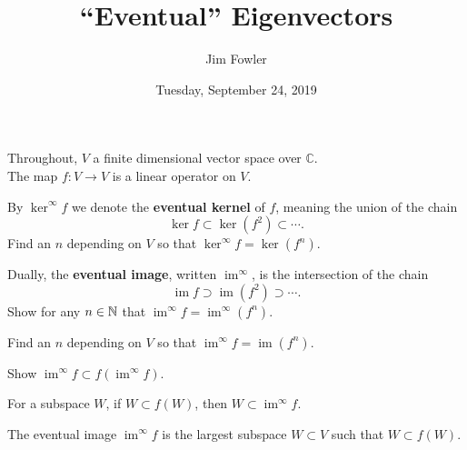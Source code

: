 \documentclass{homework}
\author{Jim Fowler}
\title{``Eventual'' Eigenvectors}
\date{Tuesday, September 24, 2019}
\newcommand{\C}{\mathbb{C}}
\DeclareMathOperator{\image}{im}
\begin{document}
\maketitle

Throughout, $V$ a finite dimensional vector space over $\C$. \\[1ex]
The map $f : V \to V$ is a linear operator on $V$.


\begin{problem}
  By $\ker^\infty f$ we denote the \textbf{eventual kernel} of $f$, meaning the union of the chain
  \[
    \ker f \subset \ker (f^2) \subset \cdots.
  \]
  Find an $n$ depending on $V$ so that $\ker^\infty f = \ker (f^n)$.
\end{problem}

\vfill

\begin{problem}
  Dually, the \textbf{eventual image}, written $\image^\infty$, is the intersection of the chain
  \[
    \image f \supset \image (f^2) \supset \cdots.
  \]
  Show for any $n \in \mathbb{N}$ that $\image^\infty f = \image^\infty (f^n)$.
\end{problem}

\vfill

\begin{problem}
  Find an $n$ depending on $V$ so that $\image^\infty f = \image (f^n)$.
\end{problem}

\vfill

\begin{problem}
  Show $\image^\infty f \subset f( \image^\infty f )$.
\end{problem}

\vfill

\begin{problem}
  For a subspace $W$, if $W \subset f(W)$, then $W \subset \image^\infty f$.
\end{problem}

\vfill

\begin{problem}
  The eventual image $\image^\infty f$ is the largest subspace
  $W \subset V$ such that $W \subset f(W)$.
\end{problem}

\end{document}
